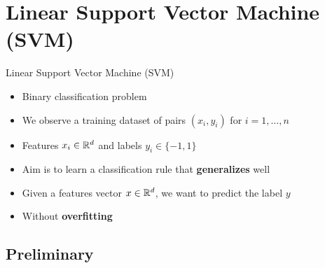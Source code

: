 \documentclass[xcolor={usenames,dvipsnames}]{beamer}
\begin{document}
\section{Linear Support Vector Machine (SVM)}


\begin{frame}{Linear Support Vector Machine (SVM)}
 \begin{itemize}
    \item Binary classification problem
    \item We observe a training dataset of pairs $(x_i, y_i)$ for $i=1, \ldots, n$
    \item Features $x_i \in \mathbb{R}^d$ and labels $y_i \in \{ -1, 1 \}$
    \item Aim is to learn a classification rule that \textbf{generalizes} well
    \item Given a features vector $x \in \mathbb{R}^d$, we want to predict the label $y$ 
    \item Without \textbf{overfitting}
  \end{itemize}
\end{frame}

\subsection{Preliminary}
\end{document}
